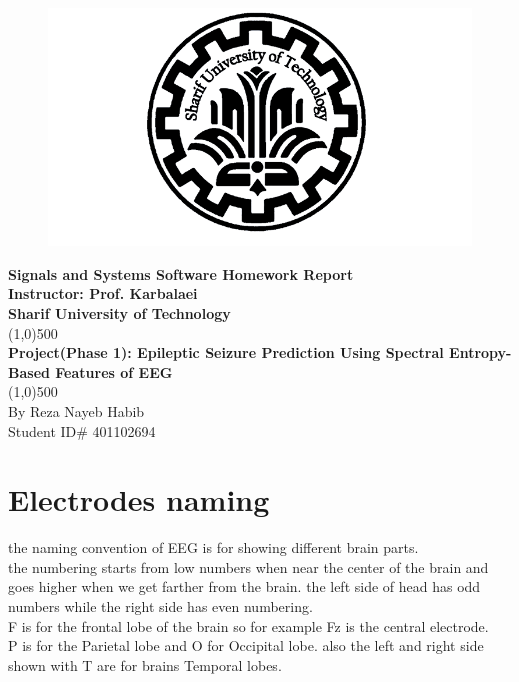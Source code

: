 \documentclass[11pt]{article}
\begin{document}
 
\begin{titlepage}
\begin{center}

\begin{figure}[H]
\begin{center}
\includegraphics[scale=0.4]{Fig/SUT.png}

\end{center}
\end{figure}

\huge{\textbf{Signals and Systems Software Homework Report}} \\ 
\vspace*{2cm}
\Large{\textbf{Instructor: Prof. Karbalaei}} \\
\vspace*{1cm}
\huge{\textbf{Sharif University of Technology}} \\
\line(1,0){500} \\ 
\Huge{\textbf{Project(Phase 1): Epileptic Seizure Prediction Using 
Spectral Entropy-Based Features of EEG}} \\
\line(1,0){500} \\
\vfill
\Large{By Reza Nayeb Habib}\\
\Large{Student ID\# 401102694} \\

\end{center}
\end{titlepage}

\tableofcontents
\thispagestyle{empty}
\clearpage
\setcounter{page}{1}


\section{Electrodes naming}
the naming convention of EEG is for showing different brain parts. \\
the numbering starts from low numbers when near the center of the brain and goes
higher when we get farther from the brain. the left side of head  has odd numbers
while the right side has even numbering. \\
F is for the frontal lobe of the brain so for example Fz is the central electrode. \\
P is for the Parietal lobe and O for Occipital lobe. also the left and right side
shown with T are for brains Temporal lobes. \\
\end{document}
